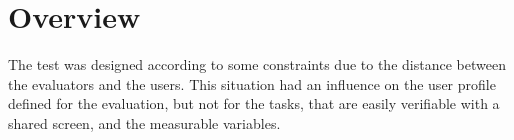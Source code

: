\documentclass[../../UsabilityReport.tex]{subfiles}
\begin{document}
\section{Overview}
	The test was designed according to some constraints due to the distance between the evaluators and the users. This situation had an influence on the user profile defined for the evaluation, but not for the tasks, that are easily verifiable with a shared screen, and the measurable variables.
\end{document}
